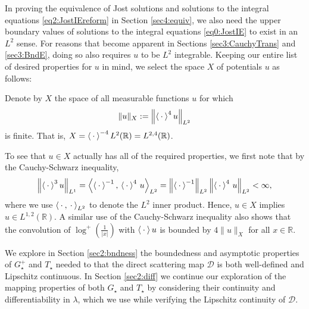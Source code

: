 \documentclass[../dissertation.tex]{subfiles}
\begin{document}
In proving the equivalence of Jost solutions and solutions to the 
integral equations \ref{eq2:JostIEreform} in Section \ref{sec4:equiv}, 
we also need the upper boundary values of solutions to the integral equations
\ref{eq0:JostIE} to exist in an $L^2$ sense. For reasons that become 
apparent in Sections \ref{sec3:CauchyTrans} and \ref{sec3:BndE}, doing so 
also requires $u$ to be $L^2$ integrable. Keeping our entire list
of desired properties for $u$ in mind, we select the space $X$ of potentials
$u$ as follows:

\begin{defn}\label{defn2:X}
	Denote by $X$ the space of all measurable functions $u$ for which
	\[
		\|u\|_X 
			:= \left\| \left\langle \kern 0.5ex \cdot \kern 0.5ex \right\rangle^4 u \right\|_{L^2}
	\]
	is finite. That is, $X = \left\langle \kern 0.5ex \cdot \kern 0.5ex \right\rangle^{-4} L^2(\mathbb R) 
	= L^{2,4}(\mathbb R)$.
\end{defn}

\begin{rmk}\label{rmk2:PostX}
	To see that $u \in X$ actually has all of the required properties, 
	we first note that by the Cauchy-Schwarz inequality, 
	\begin{align*}
		\left\|  \left\langle \kern 0.5ex \cdot \kern 0.5ex \right\rangle^3 u  \right\|_{L^1}
			= \left\langle \left\langle \kern 0.5ex \cdot \kern 0.5ex \right\rangle^{-1}, \, \left\langle \kern 0.5ex \cdot \kern 0.5ex \right\rangle^4 \, u  \right\rangle_{L^2}
			= \left\| \left\langle \kern 0.5ex \cdot \kern 0.5ex \right\rangle^{-1} \right\|_{L^2}
				\left\| \left\langle \kern 0.5ex \cdot \kern 0.5ex \right\rangle^{4} \, u \right\|_{L^2}
			< \infty,
	\end{align*}
	where we use $\left\langle \kern 0.5ex \cdot \kern 0.5ex, \kern 0.5ex \cdot \kern 0.5ex  \right\rangle_{L^2}$ to denote the $L^2$ inner
	product. Hence, $u \in X$ implies $u \in L^{1,2}(\mathbb R)$. A similar
	use of the Cauchy-Schwarz inequality also shows that the convolution 
	of $\log^+\left(\frac{1}{|x|}\right)$ with $\left\langle \kern 0.5ex \cdot \kern 0.5ex \right\rangle u$ is bounded
	by $4 \|u\|_X$ for all $x \in \mathbb R$. 
\end{rmk}



We explore in Section \ref{sec2:bndness} the boundedness and asymptotic 
properties of $G_\star^+$ and $T_\star$ needed to that the direct scattering 
map
$\mathscr D$ is both well-defined and Lipschitz continuous. In Section
\ref{sec2:diff} we continue our exploration of the mapping properties
of both $G_\star$ and $T_\star$ by considering their continuity and 
differentiability in $\lambda$, which we use while verifying the 
Lipschitz continuity of $\mathscr D$.
\end{document}

